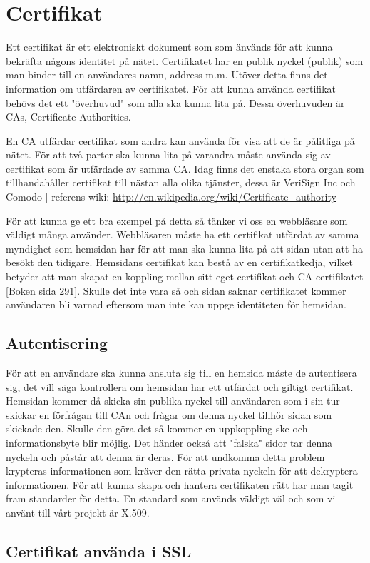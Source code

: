 \section{Certifikat}
Ett certifikat är ett elektroniskt dokument som som änvänds för att kunna bekräfta någons identitet på nätet. Certifikatet har en publik nyckel (publik) som man binder till en användares namn, address m.m. 
Utöver detta finns det information om utfärdaren av certifikatet. 
För att kunna använda certifikat behövs det ett "överhuvud" som alla ska kunna lita på. 
Dessa överhuvuden är CAs, Certificate Authorities. 

En CA utfärdar certifikat som andra kan använda för visa att de är pålitliga på nätet. För att två parter ska kunna lita på varandra måste använda sig av certifikat som är utfärdade av samma CA. Idag finns det enstaka stora organ som tillhandahåller certifikat till nästan alla olika tjänster, dessa är VeriSign Inc och Comodo  [ referens wiki: \url{http://en.wikipedia.org/wiki/Certificate_authority} ]

För att kunna ge ett bra exempel på detta så tänker vi oss en webbläsare som väldigt många använder. Webbläsaren måste ha ett certifikat utfärdat av samma myndighet som hemsidan har för att man ska kunna lita på att sidan utan att ha besökt den tidigare. Hemsidans certifikat kan bestå av en certifikatkedja, vilket betyder att man skapat en koppling mellan sitt eget certifikat och CA certifikatet [Boken sida 291]. Skulle det inte vara så och sidan saknar certifikatet kommer användaren bli varnad eftersom man inte kan uppge identiteten för hemsidan.

\subsection{Autentisering}
För att en användare ska kunna ansluta sig till en hemsida måste de autentisera sig, det vill säga kontrollera om hemsidan har ett utfärdat och giltigt certifikat. Hemsidan kommer då skicka sin publika nyckel till användaren som i sin tur skickar en förfrågan till CAn och frågar om denna nyckel tillhör sidan som skickade den. Skulle den göra det så kommer en uppkoppling ske och informationsbyte blir möjlig.
Det händer också att "falska" sidor tar denna nyckeln och påstår att denna är deras. För att undkomma detta problem krypteras informationen som kräver den rätta privata nyckeln för att dekryptera informationen.
För att kunna skapa och hantera certifikaten rätt har man tagit fram standarder för detta. En standard som används väldigt väl och som vi använt till vårt projekt är X.509.


\subsection{Certifikat använda i SSL}
